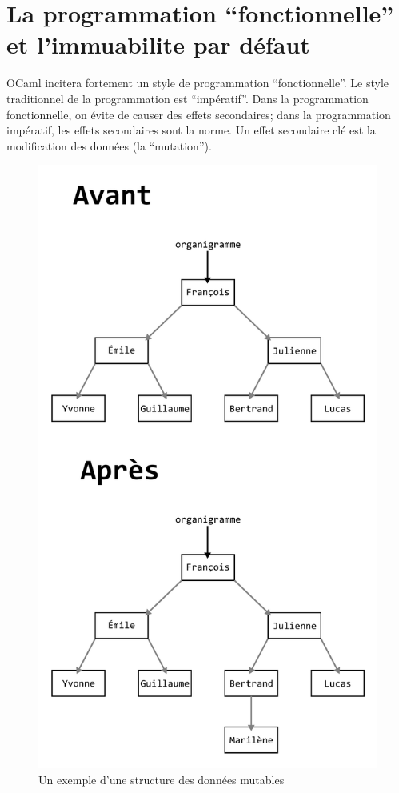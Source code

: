 \documentclass[french]{report}
\begin{document}
\section{La programmation \enquote{fonctionnelle} et l'\gls{immuabilite} par défaut}

OCaml incitera fortement un style de programmation \enquote{fonctionnelle}. Le style traditionnel de la programmation est \enquote{impératif}. Dans la programmation fonctionnelle, on évite de causer des effets secondaires; dans la programmation impératif, les effets secondaires sont la norme. Un effet secondaire clé est la modification des données (la \enquote{mutation}).

\begin{figure}[h]
	\centering
	\includegraphics[width=0.7\linewidth]{mutable_tree}
	\caption{Un exemple d'une structure des données mutables}
	\label{fig:mutable-tree}
\end{figure}
\end{document}
